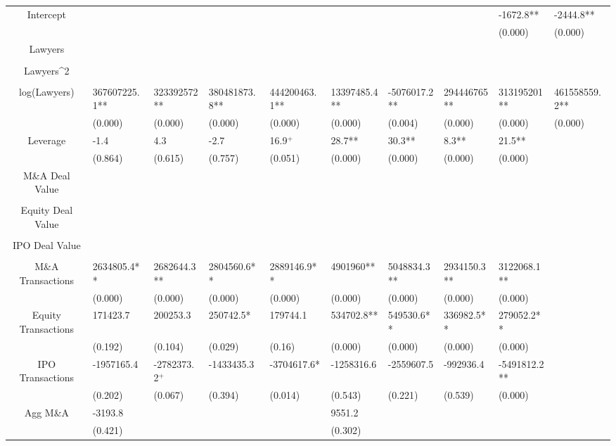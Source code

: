 \documentclass{article}
\begin{document}
\begin{table}[H]
\begin{tabular}{|clllllllll|}
Intercept &  &  &  &  &  &  &  & -1672.8** & -2444.8** \\ 
   &  &  &  &  &  &  &  & (0.000) & (0.000) \\ 
  Lawyers &  &  &  &  &  &  &  &  &  \\ 
   &  &  &  &  &  &  &  &  &  \\ 
  Lawyers^2 &  &  &  &  &  &  &  &  &  \\ 
   &  &  &  &  &  &  &  &  &  \\ 
  log(Lawyers) & 367607225.1** & 323392572** & 380481873.8** & 444200463.1** & 13397485.4** & -5076017.2** & 294446765** & 313195201** & 461558559.2** \\ 
   & (0.000) & (0.000) & (0.000) & (0.000) & (0.000) & (0.004) & (0.000) & (0.000) & (0.000) \\ 
  Leverage & -1.4 & 4.3 & -2.7 & 16.9$^{+}$ & 28.7** & 30.3** & 8.3** & 21.5** &  \\ 
   & (0.864) & (0.615) & (0.757) & (0.051) & (0.000) & (0.000) & (0.000) & (0.000) &  \\ 
  M\&A Deal Value &  &  &  &  &  &  &  &  &  \\ 
   &  &  &  &  &  &  &  &  &  \\ 
  Equity Deal Value &  &  &  &  &  &  &  &  &  \\ 
   &  &  &  &  &  &  &  &  &  \\ 
  IPO Deal Value &  &  &  &  &  &  &  &  &  \\ 
   &  &  &  &  &  &  &  &  &  \\ 
  M\&A Transactions & 2634805.4** & 2682644.3** & 2804560.6** & 2889146.9** & 4901960** & 5048834.3** & 2934150.3** & 3122068.1** &  \\ 
   & (0.000) & (0.000) & (0.000) & (0.000) & (0.000) & (0.000) & (0.000) & (0.000) &  \\ 
  Equity Transactions & 171423.7 & 200253.3 & 250742.5* & 179744.1 & 534702.8** & 549530.6** & 336982.5** & 279052.2** &  \\ 
   & (0.192) & (0.104) & (0.029) & (0.16) & (0.000) & (0.000) & (0.000) & (0.000) &  \\ 
  IPO Transactions & -1957165.4 & -2782373.2$^{+}$ & -1433435.3 & -3704617.6* & -1258316.6 & -2559607.5 & -992936.4 & -5491812.2** &  \\ 
   & (0.202) & (0.067) & (0.394) & (0.014) & (0.543) & (0.221) & (0.539) & (0.000) &  \\ 
  Agg M\&A & -3193.8 &  &  &  & 9551.2 &  &  &  &  \\ 
   & (0.421) &  &  &  & (0.302) &  &  &  &  \\ 

\end{tabular}
\end{table}
\end{document}
